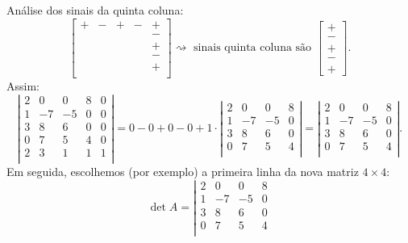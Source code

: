 \documentclass[../livro.tex]{subfiles}  %
\begin{document}
\begin{example}
Análise dos sinais da quinta coluna:
\begin{equation}
\begin{bmatrix}
+ & - & + & - & + \\
 &&&& - \\
 &&&& + \\
 &&&& - \\
 &&&& + \\
\end{bmatrix}\rightsquigarrow \text{ sinais quinta coluna são }
\begin{bmatrix}
+ \\ - \\ + \\ - \\ +
\end{bmatrix}.
\end{equation} Assim:
\begin{equation}
\left| 
\begin{matrix}
2 & 0 & 0 & 8 & 0 \\
1 & -7 & -5 & 0 & 0 \\
3 & 8 & 6 & 0 & 0 \\
0 & 7 & 5 & 4 & 0 \\
2 & 3 & 1 & 1 & 1 \\
\end{matrix}
\right| = 0 - 0 + 0 - 0 + 1\cdot 
\left| 
\begin{matrix}
2 & 0 & 0 & 8  \\
1 & -7 & -5 & 0  \\
3 & 8 & 6 & 0  \\
0 & 7 & 5 & 4  \\
\end{matrix}
\right| = 
\left| 
\begin{matrix}
2 & 0 & 0 & 8  \\
1 & -7 & -5 & 0  \\
3 & 8 & 6 & 0  \\
0 & 7 & 5 & 4  \\
\end{matrix}
\right|.
\end{equation} Em seguida, escolhemos (por exemplo) a primeira linha da nova matriz $4 \times 4$:
\begin{equation}
\det A = \left| 
\begin{matrix}
2 & 0 & 0 & 8  \\
1 & -7 & -5 & 0  \\
3 & 8 & 6 & 0  \\
0 & 7 & 5 & 4  \\

\end{matrix}
\end{equation}
\end{example}
\end{document}
